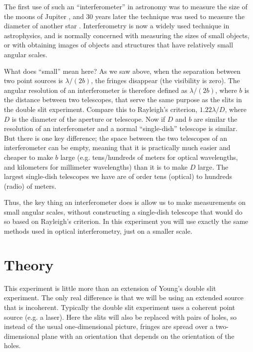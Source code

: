 \documentclass[11pt]{article}
\begin{document}
The first use of such an ``interferometer'' in astronomy was to measure the size of the moons of Jupiter \citep{1891PASP....3..274M,1891Natur..45..160M}, and 30 years later the technique was used to measure the diameter of another star \citep{1921ApJ....53..249M}. Interferometry is now a widely used technique in astrophysics, and is normally concerned with measuring the sizes of small objects, or with obtaining images of objects and structures that have relatively small angular scales.

What does ``small'' mean here? As we saw above, when the separation between two point sources is $\lambda/(2b)$, the fringes disappear (the visibility is zero). The angular resolution of an interferometer is therefore defined as $\lambda/(2b)$, where $b$ is the distance between two telescopes, that serve the same purpose as the slits in the double slit experiment. Compare this to Rayleigh's criterion, $1.22 \lambda/D$, where $D$ is the diameter of the aperture or telescope. Now if $D$ and $b$ are similar the resolution of an interferometer and a normal ``single-dish'' telescope is similar. But there is one key difference; the space between the two telescopes of an interferometer can be empty, meaning that it is practically much easier and cheaper to make $b$ large (e.g. tens/hundreds of meters for optical wavelengths, and kilometers for millimeter wavelengths) than it is to make $D$ large. The largest single-dish telescopes we have are of order tens (optical) to hundreds (radio) of meters.

Thus, the key thing an interferometer does is allow us to make measurements on small angular scales, without constructing a single-dish telescope that would do so based on Rayleigh's criterion. In this experiment you will use exactly the same methods used in optical interferometry, just on a smaller scale.

\clearpage
\section{Theory}

This experiment is little more than an extension of Young's double slit experiment. The only real difference is that we will be using an extended source that is incoherent. Typically the double slit experiment uses a coherent point source (e.g. a laser). Here the slits will also be replaced with pairs of holes, so instead of the usual one-dimensional picture, fringes are spread over a two-dimensional plane with an orientation that depends on the orientation of the holes. 
\end{document}

